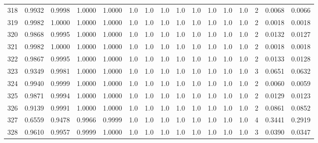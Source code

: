 \begin{tabular}{lrrrrrrrrrrrrrrr}
318 &      0.9932 &  0.9998 &  1.0000 &  1.0000 &     1.0 &     1.0 &     1.0 &     1.0 &     1.0 &     1.0 &      1.0 &        1.0 &      2 &                    0.0068 &                     0.0066 \\
319 &      0.9982 &  1.0000 &  1.0000 &  1.0000 &     1.0 &     1.0 &     1.0 &     1.0 &     1.0 &     1.0 &      1.0 &        1.0 &      2 &                    0.0018 &                     0.0018 \\
320 &      0.9868 &  0.9995 &  1.0000 &  1.0000 &     1.0 &     1.0 &     1.0 &     1.0 &     1.0 &     1.0 &      1.0 &        1.0 &      2 &                    0.0132 &                     0.0127 \\
321 &      0.9982 &  1.0000 &  1.0000 &  1.0000 &     1.0 &     1.0 &     1.0 &     1.0 &     1.0 &     1.0 &      1.0 &        1.0 &      2 &                    0.0018 &                     0.0018 \\
322 &      0.9867 &  0.9995 &  1.0000 &  1.0000 &     1.0 &     1.0 &     1.0 &     1.0 &     1.0 &     1.0 &      1.0 &        1.0 &      2 &                    0.0133 &                     0.0128 \\
323 &      0.9349 &  0.9981 &  1.0000 &  1.0000 &     1.0 &     1.0 &     1.0 &     1.0 &     1.0 &     1.0 &      1.0 &        1.0 &      3 &                    0.0651 &                     0.0632 \\
324 &      0.9940 &  0.9999 &  1.0000 &  1.0000 &     1.0 &     1.0 &     1.0 &     1.0 &     1.0 &     1.0 &      1.0 &        1.0 &      2 &                    0.0060 &                     0.0059 \\
325 &      0.9871 &  0.9994 &  1.0000 &  1.0000 &     1.0 &     1.0 &     1.0 &     1.0 &     1.0 &     1.0 &      1.0 &        1.0 &      2 &                    0.0129 &                     0.0123 \\
326 &      0.9139 &  0.9991 &  1.0000 &  1.0000 &     1.0 &     1.0 &     1.0 &     1.0 &     1.0 &     1.0 &      1.0 &        1.0 &      2 &                    0.0861 &                     0.0852 \\
327 &      0.6559 &  0.9478 &  0.9966 &  0.9999 &     1.0 &     1.0 &     1.0 &     1.0 &     1.0 &     1.0 &      1.0 &        1.0 &      4 &                    0.3441 &                     0.2919 \\
328 &      0.9610 &  0.9957 &  0.9999 &  1.0000 &     1.0 &     1.0 &     1.0 &     1.0 &     1.0 &     1.0 &      1.0 &        1.0 &      3 &                    0.0390 &                     0.0347 \\

\end{tabular}
